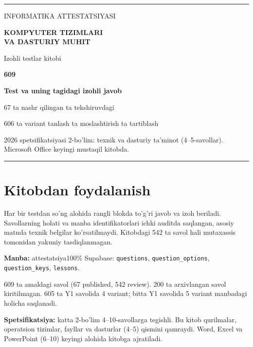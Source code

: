 \documentclass[10pt,a4paper]{article}
\begin{document}
\begin{titlepage}
\vspace*{27mm}
{\color{teal}\rule{\textwidth}{2pt}}\par
\vspace{21mm}
{\large\sffamily INFORMATIKA ATTESTATSIYASI }\par
\vspace{13mm}
{\fontsize{24}{30}\selectfont\bfseries\sffamily\color{ink}KOMPYUTER TIZIMLARI\\VA DASTURIY MUHIT}\par
\vspace{8mm}
{\large Izohli testlar kitobi}\par
\vspace{18mm}
{\Huge\bfseries\color{teal}609}\par
{\large\bfseries Test va uning tagidagi izohli javob}\par
\vspace{12mm}
67 ta nashr qilingan  ta tekshiruvdagi\par
606 ta variant tanlash  ta moslashtirish  ta tartiblash\par
\vfill
{\color{muted}2026 spetsifikatsiyasi 2-bo'lim: texnik va dasturiy ta'minot (4--5-savollar).\\
Microsoft Office keyingi mustaqil kitobda.}\par
\vspace{10mm}
{\color{teal}\rule{\textwidth}{2pt}}\par
\end{titlepage}
\section*{Kitobdan foydalanish}
Har bir testdan so'ng alohida rangli blokda to'g'ri javob va izoh beriladi.
Savollarning holati va manba identifikatorlari ichki auditda saqlangan, asosiy matnda texnik belgilar ko'rsatilmaydi.
Kitobdagi 542 ta savol hali mutaxassis tomonidan yakuniy tasdiqlanmagan.
\par\textbf{Manba:} attestatsiya100\% Supabase: \texttt{questions}, \texttt{question\_options},
\texttt{question\_keys}, \texttt{lessons}.
\par 609 ta amaldagi savol (67 published, 542 review). 200 ta arxivlangan savol kiritilmagan.
605 ta Y1 savolida 4 variant; bitta Y1 savolida 5 variant manbadagi holicha saqlanadi.
\par\textbf{Spetsifikatsiya:} katta 2-bo'lim 4--10-savollarga tegishli.
Bu kitob qurilmalar, operatsion tizimlar, fayllar va dasturlar (4--5) qismini qamraydi.
Word, Excel va PowerPoint (6--10) keyingi alohida kitobga ajratiladi.
\tableofcontents
\clearpage
\end{document}
